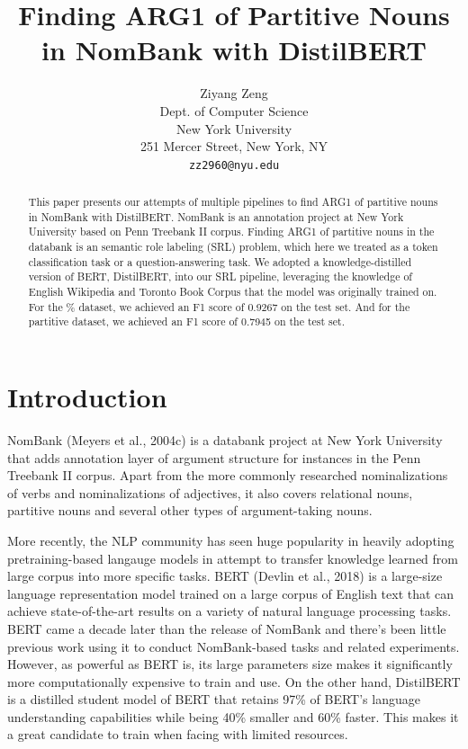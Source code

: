 \documentclass[11pt]{article}
\title{Finding ARG1 of Partitive Nouns in NomBank with DistilBERT}
\author{Ziyang Zeng \\
  Dept. of Computer Science \\
  New York University \\
  251 Mercer Street, New York, NY \\
  \texttt{zz2960@nyu.edu}}
\begin{document}
\maketitle
\begin{abstract}
  This paper presents our attempts of multiple pipelines to find ARG1 of partitive nouns in NomBank with DistilBERT. NomBank is an annotation project at New York University based on Penn Treebank II corpus. Finding ARG1 of partitive nouns in the databank is an semantic role labeling (SRL) problem, which here we treated as a token classification task or a question-answering task. We adopted a knowledge-distilled version of BERT, DistilBERT, into our SRL pipeline, leveraging the knowledge of English Wikipedia and Toronto Book Corpus that the model was originally trained on. For the \% dataset, we achieved an F1 score of 0.9267 on the test set. And for the partitive dataset, we achieved an F1 score of 0.7945 on the test set.
\end{abstract}

\section{Introduction}

NomBank (Meyers et al., 2004c) is a databank project at New York University that adds annotation layer of argument structure for instances in the Penn Treebank II corpus. Apart from the more commonly researched nominalizations of verbs and nominalizations of adjectives, it also covers relational nouns, partitive nouns and several other types of argument-taking nouns.

More recently, the NLP community has seen huge popularity in heavily adopting pretraining-based langauge models in attempt to transfer knowledge learned from large corpus into more specific tasks. BERT (Devlin et al., 2018) is a large-size language representation model trained on a large corpus of English text that can achieve state-of-the-art results on a variety of natural language processing tasks. BERT came a decade later than the release of NomBank and there's been little previous work using it to conduct NomBank-based tasks and related experiments. However, as powerful as BERT is, its large parameters size makes it significantly more computationally expensive to train and use. On the other hand, DistilBERT is a distilled student model of BERT that retains 97\% of BERT's language understanding capabilities while being 40\% smaller and 60\% faster. This makes it a great candidate to train when facing with limited resources.
\end{document}
